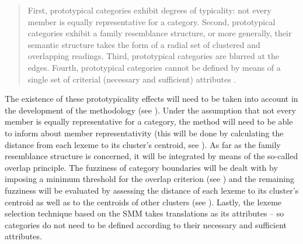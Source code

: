 \begin{quote}
First, prototypical categories exhibit degrees of typicality: not every member is equally representative for a category. Second, prototypical categories exhibit a family resemblance structure, or more generally, their semantic structure takes the form of a radial set of clustered and overlapping readings. Third, prototypical categories are blurred at the edges. Fourth, prototypical categories cannot be defined by means of a single set of criterial (necessary and sufficient) attributes \citep[187]{geeraerts_theories_2010}.
\end{quote}

The existence of these prototypicality effects will need to be taken into account in the development of the methodology (see ). Under the assumption that not every member is equally representative for a category, the method will need to be able to inform about member representativity (this will be done by calculating the distance from each lexeme to its cluster’s centroid, see ). As far as the family resemblance structure is concerned, it will be integrated by means of the so-called overlap principle. The fuzziness of category boundaries will be dealt with by imposing a minimum threshold for the overlap criterion (see ) and the remaining fuzziness will be evaluated by assessing the distance of each lexeme to its cluster’s centroid as well as to the centroids of other clusters (see ). Lastly, the lexeme selection technique based on the SMM takes translations as its attributes – so categories do not need to be defined according to their necessary and sufficient attributes.

